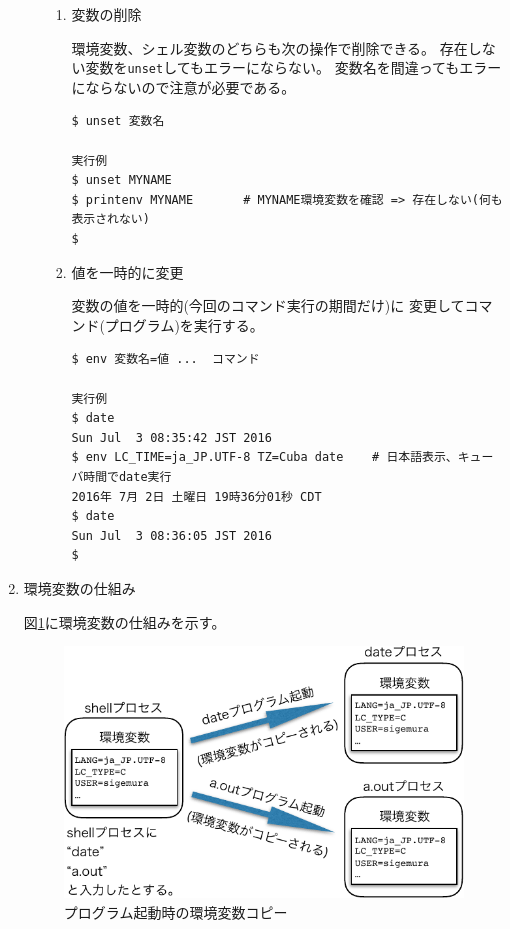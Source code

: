 \documentclass[a4j,dvipdfmx]{jarticle}
\begin{document}
\begin{enumerate}
\begin{enumerate}
\begin{enumerate}
\item 変数の削除

環境変数、シェル変数のどちらも次の操作で削除できる。
存在しない変数を\verb/unset/してもエラーにならない。
変数名を間違ってもエラーにならないので注意が必要である。

\begin{lstlisting}[numbers=none]
$ unset 変数名

実行例
$ unset MYNAME
$ printenv MYNAME       # MYNAME環境変数を確認 => 存在しない(何も表示されない)
$
\end{lstlisting}

\item 値を一時的に変更

変数の値を一時的(今回のコマンド実行の期間だけ)に
変更してコマンド(プログラム)を実行する。

\begin{lstlisting}[numbers=none]
$ env 変数名=値 ...  コマンド

実行例
$ date
Sun Jul  3 08:35:42 JST 2016
$ env LC_TIME=ja_JP.UTF-8 TZ=Cuba date    # 日本語表示、キューバ時間でdate実行
2016年 7月 2日 土曜日 19時36分01秒 CDT
$ date
Sun Jul  3 08:36:05 JST 2016
$
\end{lstlisting}

\end{enumerate}

\end{enumerate}

\item 環境変数の仕組み

図\ref{fig1}に環境変数の仕組みを示す。

\begin{figure}[hbtp]
  \begin{center} %
    \includegraphics[scale=0.8]{fig1-crop.pdf}
    \caption{プログラム起動時の環境変数コピー}
    \label{fig1}
  \end{center}
\end{figure}


\end{enumerate}
\end{document}
